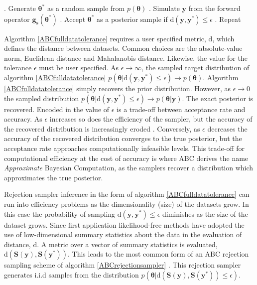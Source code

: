 \begin{algorithm}[H]
	\caption{ }
	\begin{algorithmic}
		. Generate $\bm{\theta^*}$ as a random sample from $p(\bm{\theta})$		
		. Simulate $\bm{y}$ from the forward operator $\bm{g_s}(\bm{\theta^*})$		
		. Accept $\bm{\theta^*}$ as a posterior sample if $\text{d}(\bm{y},\bm{y^*})\leq\epsilon$		
		. Repeat
	\end{algorithmic}
	\label{ABCfulldatatolerance}
\end{algorithm}

Algorithm \ref{ABCfulldatatolerance} requires a user specified metric, $\text{d}$, which defines the distance between datasets. Common choices are the absolute-value norm, Euclidean distance and Mahalanobis distance. Likewise, the value for the tolerance $\epsilon$ must be user specified. As $\epsilon \rightarrow \infty$, the sampled target distribution of algorithm \ref{ABCfulldatatolerance} $p(\bm{\theta}|\text{d}(\bm{y},\bm{y^*})\leq\epsilon) \rightarrow p(\bm{\theta})$.  Algorithm \ref{ABCfulldatatolerance} simply recovers the prior distribution. However, as $\epsilon \rightarrow 0$ the sampled distribution $p(\bm{\theta}|\text{d}(\bm{y},\bm{y^*})\leq\epsilon) \rightarrow p(\bm{\theta}|\bm{y})$. The exact posterior is recovered. Encoded in the value of $\epsilon$ is a trade-off between acceptance rate and accuracy. As $\epsilon$ increases so does the efficiency of the sampler, but the accuracy of the recovered distribution is increasingly eroded \citep{Sisson2010a}. Conversely, as $\epsilon$ decreases the accuracy of the recovered distribution converges to the true posterior, but the acceptance rate approaches computationally infeasible levels. This trade-off for computational efficiency at the cost of accuracy is where ABC derives the name \textit{Approximate} Bayesian Computation, as the samplers recover a distribution which approximates the true posterior.\par

Rejection sampler inference in the form of algorithm \ref{ABCfulldatatolerance} can run into efficiency problems as the dimensionality (size) of the datasets grow. In this case the probability of sampling $\text{d}(\bm{y},\bm{y^*})\leq\epsilon$ diminishes as the size of the dataset grows. Since first application \citep{Tavare1997} likelihood-free methods have adopted the use of low-dimensional summary statistics about the data in the evaluation of distance, $\text{d}$. A metric over a vector of summary statistics is evaluated, $\text{d}(\bm{S}(\bm{y}),\bm{S}(\bm{y^*}))$. This leads to the most common form of an ABC rejection sampling scheme of algorithm \ref{ABCrejectionsampler} \citep{Pritchard1999a}. This rejection sampler generates i.i.d samples from the distribution $p(\bm{\theta}|\text{d}(\bm{S}(\bm{y}),\bm{S}(\bm{y^*}))\leq\epsilon)$.


